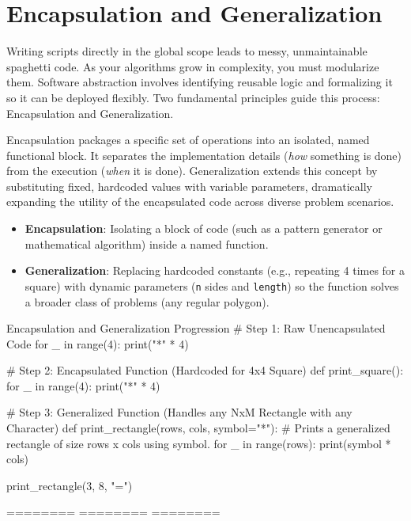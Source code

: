 \section{Encapsulation and Generalization}

Writing scripts directly in the global scope leads to messy, unmaintainable spaghetti code. As your algorithms grow in complexity, you must modularize them. Software abstraction involves identifying reusable logic and formalizing it so it can be deployed flexibly. Two fundamental principles guide this process: Encapsulation and Generalization.

Encapsulation packages a specific set of operations into an isolated, named functional block. It separates the implementation details (\textit{how} something is done) from the execution (\textit{when} it is done). Generalization extends this concept by substituting fixed, hardcoded values with variable parameters, dramatically expanding the utility of the encapsulated code across diverse problem scenarios.

\begin{conceptbox}
\begin{itemize}[leftmargin=1.5em]
    \item \textbf{Encapsulation}: Isolating a block of code (such as a pattern generator or mathematical algorithm) inside a named function.
    \item \textbf{Generalization}: Replacing hardcoded constants (e.g., repeating 4 times for a square) with dynamic parameters (\texttt{n} sides and \texttt{length}) so the function solves a broader class of problems (any regular polygon).
\end{itemize}
\end{conceptbox}

\begin{pythoncode}{Encapsulation and Generalization Progression}
# Step 1: Raw Unencapsulated Code
for _ in range(4):
    print("*" * 4)

# Step 2: Encapsulated Function (Hardcoded for 4x4 Square)
def print_square():
    for _ in range(4):
        print("*" * 4)

# Step 3: Generalized Function (Handles any NxM Rectangle with any Character)
def print_rectangle(rows, cols, symbol="*"):
    # Prints a generalized rectangle of size rows x cols using symbol.
    for _ in range(rows):
        print(symbol * cols)

print_rectangle(3, 8, "=")
\end{pythoncode}
\begin{outputbox}
========
========
========
\end{outputbox}

